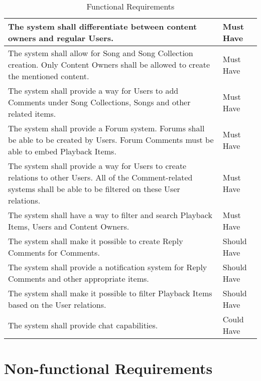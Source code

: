 \begin{table}[h!]
\begin{tabular}{|p{12cm}|p{3cm}|}
        \hline
        The system shall differentiate between content owners and regular Users.                                                                                              & Must Have         \\
        \hline
        The system shall allow for Song and Song Collection creation. Only Content Owners shall be allowed to create the mentioned content. & Must Have\\
        \hline
        The system shall provide a way for Users to add Comments under Song Collections, Songs and other related items. & Must Have \\
        \hline
        The system shall provide a Forum system. Forums shall be able to be created by Users. Forum Comments must be able to embed Playback Items. & Must Have \\
        \hline
        The system shall provide a way for Users to create relations to other Users. All of the Comment-related systems shall be able to be filtered on these User relations. & Must Have \\
        \hline
        The system shall have a way to filter and search Playback Items, Users and Content Owners. & Must Have \\
        \hline
        The system shall make it possible to create Reply Comments for Comments.                                                                                              & Should Have       \\
        \hline
        The system shall provide a notification system for Reply Comments and other appropriate items.                                                                                              & Should Have       \\
        \hline
        The system shall make it possible to filter Playback Items based on the User relations. & Should Have \\
        \hline
        The system shall provide chat capabilities.                                                                                                                           & Could Have        \\
        \hline
    \end{tabular}
    \caption{Functional Requirements}
\end{table}


\clearpage


\section{Non-functional Requirements}

